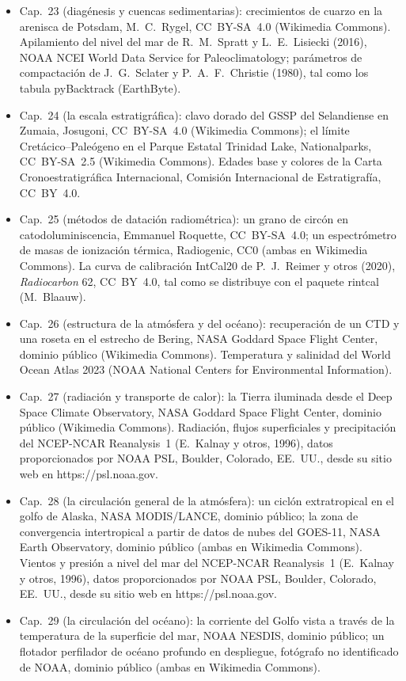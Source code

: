 \begin{itemize}
  \item Cap.~23 (diagénesis y cuencas sedimentarias): crecimientos de cuarzo en la arenisca de Potsdam, M.~C.~Rygel, CC~BY-SA~4.0 (Wikimedia Commons). Apilamiento del nivel del mar de R.~M.~Spratt y L.~E.~Lisiecki (2016), NOAA NCEI World Data Service for Paleoclimatology; parámetros de compactación de J.~G.~Sclater y P.~A.~F.~Christie (1980), tal como los tabula pyBacktrack (EarthByte).
  \item Cap.~24 (la escala estratigráfica): clavo dorado del GSSP del Selandiense en Zumaia, Josugoni, CC~BY-SA~4.0 (Wikimedia Commons); el límite Cretácico--Paleógeno en el Parque Estatal Trinidad Lake, Nationalparks, CC~BY-SA~2.5 (Wikimedia Commons). Edades base y colores de la Carta Cronoestratigráfica Internacional, Comisión Internacional de Estratigrafía, CC~BY~4.0.
  \item Cap.~25 (métodos de datación radiométrica): un grano de circón en catodoluminiscencia, Emmanuel Roquette, CC~BY-SA~4.0; un espectrómetro de masas de ionización térmica, Radiogenic, CC0 (ambas en Wikimedia Commons). La curva de calibración IntCal20 de P.~J.~Reimer y otros (2020), \emph{Radiocarbon} 62, CC~BY~4.0, tal como se distribuye con el paquete rintcal (M.~Blaauw).
  \item Cap.~26 (estructura de la atmósfera y del océano): recuperación de un CTD y una roseta en el estrecho de Bering, NASA Goddard Space Flight Center, dominio público (Wikimedia Commons). Temperatura y salinidad del World Ocean Atlas 2023 (NOAA National Centers for Environmental Information).
  \item Cap.~27 (radiación y transporte de calor): la Tierra iluminada desde el Deep Space Climate Observatory, NASA Goddard Space Flight Center, dominio público (Wikimedia Commons). Radiación, flujos superficiales y precipitación del NCEP-NCAR Reanalysis~1 (E.~Kalnay y otros, 1996), datos proporcionados por NOAA PSL, Boulder, Colorado, EE.~UU., desde su sitio web en https://psl.noaa.gov.
  \item Cap.~28 (la circulación general de la atmósfera): un ciclón extratropical en el golfo de Alaska, NASA MODIS/LANCE, dominio público; la zona de convergencia intertropical a partir de datos de nubes del GOES-11, NASA Earth Observatory, dominio público (ambas en Wikimedia Commons). Vientos y presión a nivel del mar del NCEP-NCAR Reanalysis~1 (E.~Kalnay y otros, 1996), datos proporcionados por NOAA PSL, Boulder, Colorado, EE.~UU., desde su sitio web en https://psl.noaa.gov.
  \item Cap.~29 (la circulación del océano): la corriente del Golfo vista a través de la temperatura de la superficie del mar, NOAA NESDIS, dominio público; un flotador perfilador de océano profundo en despliegue, fotógrafo no identificado de NOAA, dominio público (ambas en Wikimedia Commons).
\end{itemize}
